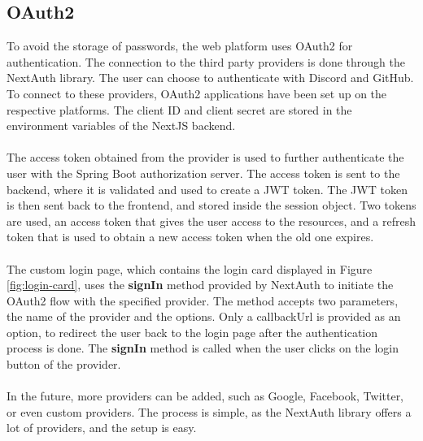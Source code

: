 \subsection{OAuth2}

\noindent To avoid the storage of passwords, the web platform uses OAuth2 for authentication. The connection to the third party providers is done through the NextAuth library. The user can choose to authenticate with Discord and GitHub. To connect to these providers, OAuth2 applications have been set up on the respective platforms. The client ID and client secret are stored in the environment variables of the NextJS backend.
\\\\
The access token obtained from the provider is used to further authenticate the user with the Spring Boot authorization server. The access token is sent to the backend, where it is validated and used to create a JWT token. The JWT token is then sent back to the frontend, and stored inside the session object. Two tokens are used, an access token that gives the user access to the resources, and a refresh token that is used to obtain a new access token when the old one expires.
\\\\
\noindent The custom login page, which contains the login card displayed in Figure \ref{fig:login-card}, uses the \textbf{signIn} method provided by NextAuth to initiate the OAuth2 flow with the specified provider. The method accepts two parameters, the name of the provider and the options. Only a callbackUrl is provided as an option, to redirect the user back to the login page after the authentication process is done. The \textbf{signIn} method is called when the user clicks on the login button of the provider.
\\\\
\noindent In the future, more providers can be added, such as Google, Facebook, Twitter, or even custom providers. The process is simple, as the NextAuth library offers a lot of providers, and the setup is easy.

